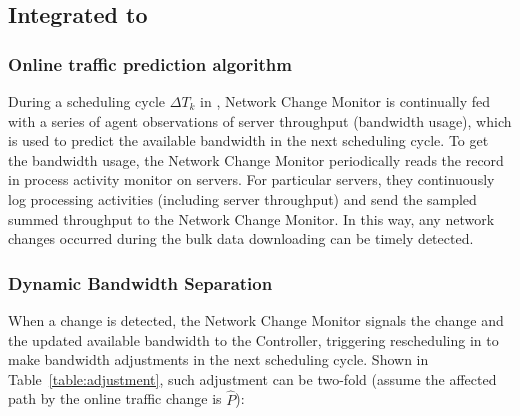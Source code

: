 {\subsection{Integrated to \name}
\subsubsection{Online traffic prediction algorithm}


During a scheduling cycle $\Delta T_k$ in \name, Network Change Monitor is continually fed with a series of agent observations of server throughput (bandwidth usage), which is used to predict the available bandwidth in the next scheduling cycle. To get the bandwidth usage, the Network Change Monitor periodically reads the record in process activity monitor on servers. For particular servers, they continuously log processing activities (including server throughput) and send the sampled summed throughput to the Network Change Monitor. In this way, any network changes occurred during the bulk data downloading can be timely detected.


\subsubsection{Dynamic Bandwidth Separation}

When a change is detected, the Network Change Monitor signals the change and the updated available bandwidth to the Controller, triggering rescheduling in \name to make bandwidth adjustments in the next scheduling cycle. Shown in Table~\ref{table:adjustment}, such adjustment can be two-fold (assume the affected path by the online traffic change is $\hat{P}$):

}
